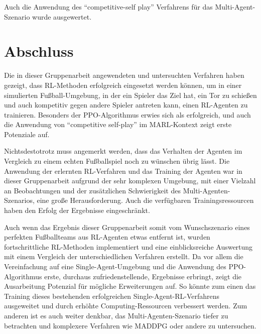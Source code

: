 \documentclass[twocolumn]{webofc}
\begin{document}
Auch die Anwendung des \enquote{competitive-self play} Verfahrens für das Multi-Agent-Szenario wurde ausgewertet.



\section{Abschluss} \label{sec-3}

Die in dieser Gruppenarbeit angewendeten und untersuchten Verfahren haben gezeigt, dass \ac{RL}-Methoden erfolgreich eingesetzt werden können, um in einer simulierten Fußball-Umgebung, in der ein Spieler das Ziel hat, ein Tor zu schießen und auch kompetitiv gegen andere Spieler antreten kann, einen \ac{RL}-Agenten zu trainieren. Besonders der \ac{PPO}-Algorithmus erwies sich als erfolgreich, und auch die Anwendung von \enquote{competitive self-play} im \ac{MARL}-Kontext zeigt erste Potenziale auf.

Nichtsdestotrotz muss angemerkt werden, dass das Verhalten der Agenten im Vergleich zu einem echten Fußballspiel 
noch zu wünschen übrig lässt. Die Anwendung der erlernten \ac{RL}-Verfahren und das Training der Agenten war in dieser Gruppenarbeit aufgrund der sehr komplexen Umgebung, mit einer Vielzahl an Beobachtungen und der zusätzlichen Schwierigkeit des Multi-Agenten-Szenarios, eine große Herausforderung. Auch die verfügbaren Trainingsressourcen haben den Erfolg der Ergebnisse eingeschränkt.

Auch wenn das Ergebnis dieser Gruppenarbeit somit vom Wunschszenario eines perfekten Fußballteams aus \ac{RL}-Agenten etwas entfernt ist, wurden fortschrittliche \ac{RL}-Methoden implementiert und eine einblicksreiche Auswertung mit einem Vergleich der unterschiedlichen Verfahren erstellt. Da vor allem die Vereinfachung auf eine Single-Agent-Umgebung und die Anwendung des \ac{PPO}-Algorithmus erste, durchaus zufriedenstellende, Ergebnisse erbringt, zeigt die Ausarbeitung Potenzial für mögliche Erweiterungen auf. So könnte zum einen das Training dieses bestehenden erfolgreichen Single-Agent-RL-Verfahrens ausgeweitet und durch erhöhte Computing-Ressourcen verbessert werden. Zum anderen ist es auch weiter denkbar, das Multi-Agenten-Szenario tiefer zu betrachten und komplexere Verfahren wie MADDPG oder andere zu untersuchen.


%

\end{document}

